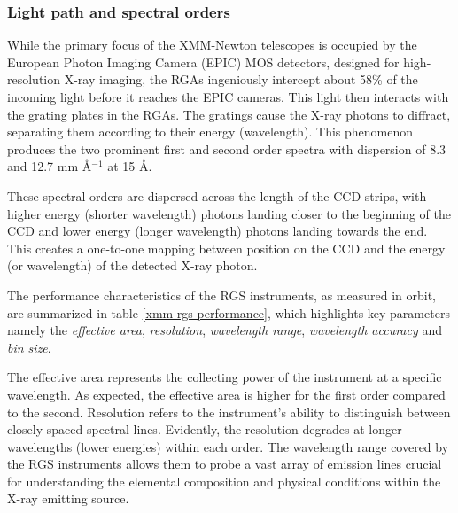 			\subsubsection{Light path and spectral orders}
				While the primary focus of the XMM-Newton telescopes is occupied by the European Photon Imaging Camera (EPIC) MOS detectors, designed for high-resolution X-ray imaging, the RGAs ingeniously intercept about 58\% of the incoming light before it reaches the EPIC cameras. This light then interacts with the grating plates in the RGAs. The gratings cause the X-ray photons to diffract, separating them according to their energy (wavelength). This phenomenon produces the two prominent first and second order spectra with dispersion of 8.3 and 12.7 mm \AA$^{-1}$ at 15 \AA.
				
				These spectral orders are dispersed across the length of the CCD strips, with higher energy (shorter wavelength) photons landing closer to the beginning of the CCD and lower energy (longer wavelength) photons landing towards the end. This creates a one-to-one mapping between position on the CCD and the energy (or wavelength) of the detected X-ray photon.
				
				The performance characteristics of the RGS instruments, as measured in orbit, are summarized in table \ref{xmm-rgs-performance}, which highlights key parameters namely the \textit{effective area}, \textit{resolution}, \textit{wavelength range}, \textit{wavelength accuracy} and \textit{bin size}.
		
				The effective area represents the collecting power of the instrument at a specific wavelength. As expected, the effective area is higher for the first order compared to the second. Resolution refers to the instrument's ability to distinguish between closely spaced spectral lines. Evidently, the resolution degrades at longer wavelengths (lower energies) within each order. The wavelength range covered by the RGS instruments allows them to probe a vast array of emission lines crucial for understanding the elemental composition and physical conditions within the X-ray emitting source.
				
